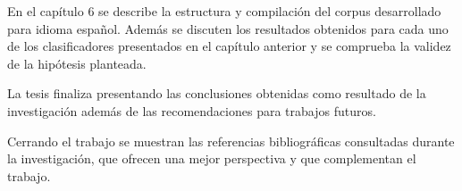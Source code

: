 \begin{introduction}
En el capítulo 6 se describe la estructura y compilación del corpus desarrollado
para idioma español. Además se discuten los resultados obtenidos para cada uno de los 
clasificadores presentados en el capítulo anterior y se comprueba la 
validez de la hipótesis planteada.

La tesis finaliza presentando las conclusiones obtenidas como resultado de
la investigación además de las recomendaciones para trabajos futuros. 

Cerrando el trabajo se muestran las referencias
bibliográficas consultadas durante la investigación, que ofrecen una mejor
perspectiva y que complementan el trabajo.


\end{introduction}
